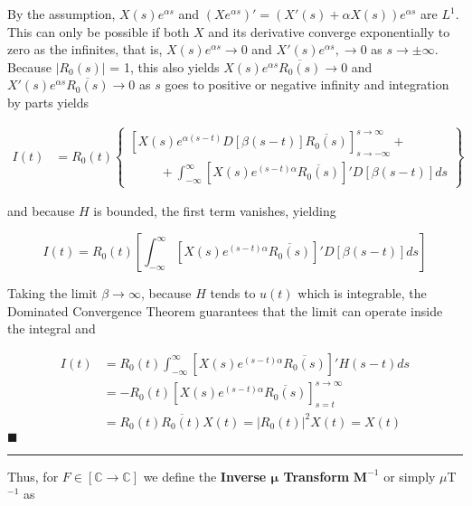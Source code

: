 	By the assumption, $X(s)e^{\alpha s}$ and $\left(Xe^{\alpha s}\right)' = \left(X'(s) + \alpha X(s)\right)e^{\alpha s}$ are $L^1$. This can only be possible if both $X$ and its derivative converge exponentially to zero as the infinites, that is, $X(s)e^{\alpha s}\to 0$ and $X'(s)e^{\alpha s},\to 0$ as $s\to \pm\infty$. Because $\left\lvert R_0(s)\right\rvert$ = 1, this also yields $X(s)e^{\alpha s}\overline{R_0(s)}\to 0$ and $X'(s)e^{\alpha s}\overline{R_0(s)}\to 0$ as $s$ goes to positive or negative infinity and integration by parts yields

\begin{align}
	I(t) &= R_0(t) \left\{ \begin{array}{l} \left[X(s) e^{\alpha\left(s - t\right)} D\left[\beta\left(s-t\right)\right]\overline{R_0(s)}\right]_{s\to -\infty}^{s\to\infty} + \\[3mm] \hspace{1cm}+\displaystyle\int_{-\infty}^{\infty} \left[X(s)e^{\left(s-t\right)\alpha}\overline{R_0(s)}\right]'D\left[\beta\left(s-t\right)\right] ds \end{array}\right\}
\end{align}

	\noindent and because $H$ is bounded, the first term vanishes, yielding

\begin{equation} I(t) = R_0(t)\left[\int_{-\infty}^{\infty} \left[X(s)e^{\left(s-t\right)\alpha}\overline{R_0(s)}\right]'D\left[\beta\left(s-t\right)\right] ds\right] \end{equation}

	Taking the limit $\beta\to\infty$, because $H$ tends to $u(t)$ which is integrable, the Dominated Convergence Theorem guarantees that the limit can operate inside the integral and

\begin{align}
	I(t) &= R_0(t)\int_{-\infty}^{\infty} \left[X(s)e^{\left(s-t\right)\alpha}\overline{R_0(s)}\right]' H\left(s-t\right) ds \nonumber\\[3mm] &= -R_0(t)\left[X(s)e^{\left(s-t\right)\alpha}\overline{R_0(s)}\right]_{s=t}^{s\to\infty} \nonumber\\[3mm] &= R_0(t) \overline{R_0(t)} X(t) = \left\lvert R_0(t)\right\rvert^2 X(t) = X(t)
\end{align}
\hfill$\blacksquare$\vspace{5mm}\hrule\vspace{5mm} %

	Thus, for $F\in\left[\mathbb{C}\to\mathbb{C}\right]$ we define the \textbf{Inverse $\boldsymbol{\mu}$ Transform} $\mathbf{M}^{-1}$ or simply $\mu$T$^{-1}$ as

